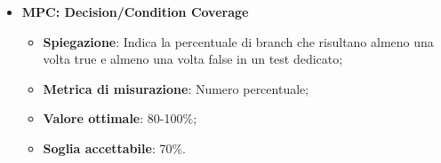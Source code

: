 \begin{itemize}
    \item \textbf{MPC: Decision/Condition Coverage}
    \begin{itemize}
        \item \textbf{Spiegazione}: Indica la percentuale di branch che risultano almeno una volta true e almeno una volta false in un test dedicato;
        \item \textbf{Metrica di misurazione}: Numero percentuale;
        \item \textbf{Valore ottimale}: 80-100\%;
        \item \textbf{Soglia accettabile}: 70\%.
    \end{itemize}
\end{itemize}


